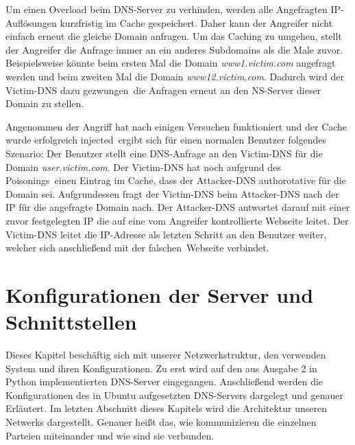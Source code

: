 \documentclass[10pt,a4paper]{article}
\begin{document}
Um einen Overload beim DNS-Server zu verhinden, werden alle Angefragten IP-Auflösungen kurzfristig im Cache gespeichert. Daher kann der Angreifer nicht einfach erneut die gleiche Domain anfragen. Um das Caching zu \glqq umgehen\grqq, stellt der Angreifer die Anfrage immer an ein anderes Subdomains als die Male zuvor. Beispielsweise könnte beim ersten Mal die Domain \emph{www1.victim.com} angefragt werden und beim zweiten Mal die Domain \emph{www12.victim.com}. Dadurch wird der Victim-DNS dazu \glqq gezwungen\grqq\ die Anfragen erneut an den NS-Server dieser Domain zu stellen.

Angenommen der Angriff hat nach einigen Versuchen funktioniert und der Cache wurde erfolgreich \glqq injected\grqq\ ergibt sich für einen normalen Benutzer folgendes Szenario: Der Benutzer stellt eine DNS-Anfrage an den Victim-DNS für die Domain \emph{user.victim.com}. Der Victim-DNS hat noch aufgrund des \glqq Poisonings\grqq\ einen Eintrag im Cache, dass der Attacker-DNS authorotative für die Domain sei. Aufgrundessen fragt der Victim-DNS beim Attacker-DNS nach der IP für die angefragte Domain nach. Der Attacker-DNS antwortet darauf mit einer zuvor festgelegten IP die auf eine vom Angreifer kontrollierte Webseite leitet. Der Victim-DNS leitet die IP-Adresse als letzten Schritt an den Benutzer weiter, welcher sich anschließend mit der \glqq falschen\grqq\ Webseite verbindet.

\section{Konfigurationen der Server und Schnittstellen}
Dieses Kapitel beschäftig sich mit unserer Netzwerkstruktur, den verwenden System und ihren Konfigurationen. Zu erst wird auf den aus Ausgabe 2 in Python implementierten DNS-Server eingegangen. Anschließend werden die Konfigurationen des in Ubuntu aufgesetzten DNS-Servers dargelegt und genauer Erläutert. Im letzten Abschnitt dieses Kapitels wird die Architektur unseren Netwerks dargestellt. Genauer heißt das, wie kommunizieren die einzelnen Parteien miteinander und wie sind sie verbunden.
\end{document}
